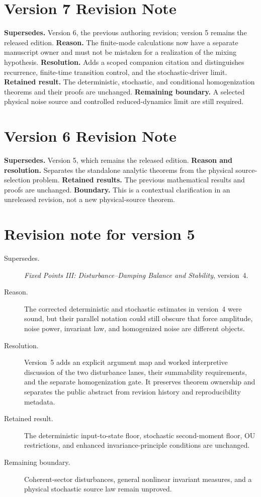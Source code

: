\documentclass[11pt]{article}
\begin{document}
\section*{Version 7 Revision Note}
\noindent\textbf{Supersedes.} Version 6, the previous authoring revision;
version 5 remains the released edition.
\textbf{Reason.} The finite-mode calculations now have a separate manuscript
owner and must not be mistaken for a realization of the mixing hypothesis.
\textbf{Resolution.} Adds a scoped companion citation and distinguishes
recurrence, finite-time transition control, and the stochastic-driver limit.
\textbf{Retained result.} The deterministic, stochastic, and conditional
homogenization theorems and their proofs are unchanged.
\textbf{Remaining boundary.} A selected physical noise source and controlled
reduced-dynamics limit are still required.

\section*{Version 6 Revision Note}
\noindent\textbf{Supersedes.} Version 5, which remains the released edition.
\textbf{Reason and resolution.} Separates the standalone analytic theorems from the physical source-selection problem.
\textbf{Retained results.} The previous mathematical results and proofs are unchanged.
\textbf{Boundary.} This is a contextual clarification in an unreleased revision,
not a new physical-source theorem.

\section*{Revision note for version 5}
\begin{description}
\item[Supersedes.] \emph{Fixed Points III: Disturbance--Damping Balance and
Stability}, version~4.
\item[Reason.] The corrected deterministic and stochastic estimates in
version~4 were sound, but their parallel notation could still obscure that
force amplitude, noise power, invariant law, and homogenized noise are
different objects.
\item[Resolution.] Version~5 adds an explicit argument map and worked
interpretive discussion of the two disturbance lanes, their summability
requirements, and the separate homogenization gate. It preserves theorem
ownership and separates the public abstract from revision history and
reproducibility metadata.
\item[Retained result.] The deterministic input-to-state floor, stochastic
second-moment floor, OU restrictions, and enhanced invariance-principle
conditions are unchanged.
\item[Remaining boundary.] Coherent-sector disturbances, general nonlinear
invariant measures, and a physical stochastic source law remain unproved.
\end{description}
\end{document}
